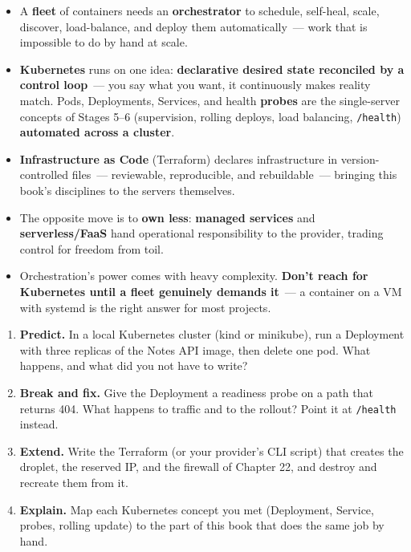 \label{43-cloud-native-orchestration:key-takeaways}
\begin{takeaways}

\begin{itemize}
\tightlist
\item
  A \textbf{fleet} of containers needs an \textbf{orchestrator} to schedule, self-heal, scale, discover, load-balance, and deploy them automatically~--- work that is impossible to do by hand at scale.
\item
  \textbf{Kubernetes} runs on one idea: \textbf{declarative desired state reconciled by a control loop}~--- you say what you want, it continuously makes reality match. Pods, Deployments, Services, and health \textbf{probes} are the single-server concepts of Stages 5--6 (supervision, rolling deploys, load balancing, \texttt{/health}) \textbf{automated across a cluster}.
\item
  \textbf{Infrastructure as Code} (Terraform) declares infrastructure in version-controlled files~--- reviewable, reproducible, and rebuildable~--- bringing this book's disciplines to the servers themselves.
\item
  The opposite move is to \textbf{own less}: \textbf{managed services} and \textbf{serverless/FaaS} hand operational responsibility to the provider, trading control for freedom from toil.
\item
  Orchestration's power comes with heavy complexity. \textbf{Don't reach for Kubernetes until a fleet genuinely demands it}~--- a container on a VM with systemd is the right answer for most projects.
\end{itemize}

\end{takeaways}

\label{43-cloud-native-orchestration:exercises}

\begin{enumerate}
\def\labelenumi{\arabic{enumi}.}
\tightlist
\item
  \textbf{Predict.} In a local Kubernetes cluster (kind or minikube), run a Deployment with three replicas of the Notes API image, then delete one pod. What happens, and what did you not have to write?
\item
  \textbf{Break and fix.} Give the Deployment a readiness probe on a path that returns 404. What happens to traffic and to the rollout? Point it at \texttt{/health} instead.
\item
  \textbf{Extend.} Write the Terraform (or your provider's CLI script) that creates the droplet, the reserved IP, and the firewall of Chapter 22, and destroy and recreate them from it.
\item
  \textbf{Explain.} Map each Kubernetes concept you met (Deployment, Service, probes, rolling update) to the part of this book that does the same job by hand.
\end{enumerate}

